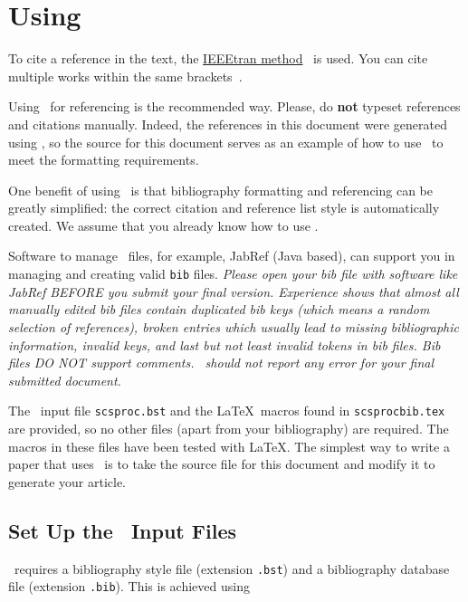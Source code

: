\documentclass{scspaperproc}
\theoremstyle{scsthe}
\begin{document}
    \section{Using \BibTeX}
    \label{sec:bibtex}

    To cite a reference in the text, the \href{https://www.bibtex.com/s/bibliography-style-ieeetran-ieeetran/}{IEEEtran method}~\cite{IEEEtran} is used.
    You can cite multiple works within the same brackets~\cite{IEEEtran, chi89, bcnn:simulation}.

    Using \BibTeX\ for referencing is the recommended way. Please, do \textbf{not} typeset references and citations manually. Indeed, the references in this document were generated using \BibTeX, so the source for this document serves as an example of how to use \BibTeX\ to meet the formatting requirements.

    One benefit of using \BibTeX\ is that bibliography formatting and referencing can be greatly simplified: the correct citation and reference list style is automatically created. We assume that you already know how to use \BibTeX.

    Software to manage \BibTeX\ files, for example, JabRef (Java based), can support you in managing and creating valid \texttt{bib} files.
    \emph{Please open your bib file with software like JabRef BEFORE you submit your final version. Experience shows that almost all manually edited bib files contain duplicated bib keys (which means a random selection of references), broken entries which usually lead to missing bibliographic information, invalid keys, and last but not least invalid tokens in bib files. Bib files DO NOT support comments. \BibTeX\ should not report any error for your final submitted document.}

    The \BibTeX\ input file \texttt{scsproc.bst} and the \LaTeX\ macros found in \texttt{scsprocbib.tex} are provided, so no other files (apart from your bibliography) are required. The macros in these files have been tested with \LaTeX. The simplest way to write a paper that uses \BibTeX\ is to take the source file for this document and modify it to generate your article.

    \subsection{Set Up the \BibTeX\ Input Files}

    \BibTeX\ requires a bibliography style file (extension \texttt{.bst}) and a bibliography database file (extension \texttt{.bib}).  This is achieved using
\end{document}
